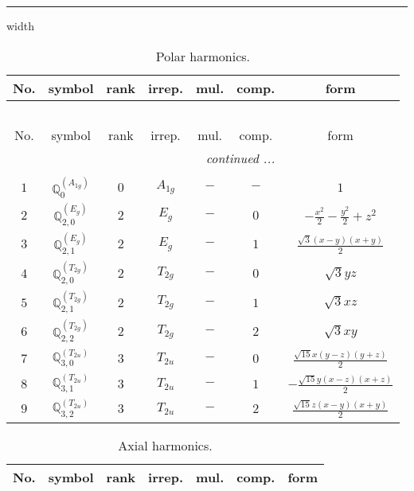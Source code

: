 \documentclass[fleqn,10pt,landscape]{article}
\begin{document}
\begin{itemize}
 \hfil \hrule height 1mm width \textwidth \hfil

\begin{center}
\renewcommand{\arraystretch}{1.3}
\begin{longtable}{ccccccc}
\caption{Polar harmonics.}
 \\
 \hline \hline
No. & symbol & rank & irrep. & mul. & comp. & form \\ \hline \endfirsthead

\multicolumn{6}{l}{\tablename\ \thetable{}} \\
 \hline \hline
No. & symbol & rank & irrep. & mul. & comp. & form \\ \hline \endhead

 \hline \hline
\multicolumn{6}{r}{\footnotesize\it continued ...} \\ \endfoot

 \hline \hline
\multicolumn{6}{r}{} \\ \endlastfoot

$ 1 $ & $ \mathbb{Q}_{0}^{(A_{1g})} $ & $ 0 $ & $ A_{1g} $ & $ - $ & $ - $ & $ 1 $ \\ \hline
$ 2 $ & $ \mathbb{Q}_{2,0}^{(E_{g})} $ & $ 2 $ & $ E_{g} $ & $ - $ & $ 0 $ & $ - \frac{x^{2}}{2} - \frac{y^{2}}{2} + z^{2} $ \\
$ 3 $ & $ \mathbb{Q}_{2,1}^{(E_{g})} $ & $ 2 $ & $ E_{g} $ & $ - $ & $ 1 $ & $ \frac{\sqrt{3} \left(x - y\right) \left(x + y\right)}{2} $ \\
$ 4 $ & $ \mathbb{Q}_{2,0}^{(T_{2g})} $ & $ 2 $ & $ T_{2g} $ & $ - $ & $ 0 $ & $ \sqrt{3} y z $ \\
$ 5 $ & $ \mathbb{Q}_{2,1}^{(T_{2g})} $ & $ 2 $ & $ T_{2g} $ & $ - $ & $ 1 $ & $ \sqrt{3} x z $ \\
$ 6 $ & $ \mathbb{Q}_{2,2}^{(T_{2g})} $ & $ 2 $ & $ T_{2g} $ & $ - $ & $ 2 $ & $ \sqrt{3} x y $ \\ \hline
$ 7 $ & $ \mathbb{Q}_{3,0}^{(T_{2u})} $ & $ 3 $ & $ T_{2u} $ & $ - $ & $ 0 $ & $ \frac{\sqrt{15} x \left(y - z\right) \left(y + z\right)}{2} $ \\
$ 8 $ & $ \mathbb{Q}_{3,1}^{(T_{2u})} $ & $ 3 $ & $ T_{2u} $ & $ - $ & $ 1 $ & $ - \frac{\sqrt{15} y \left(x - z\right) \left(x + z\right)}{2} $ \\
$ 9 $ & $ \mathbb{Q}_{3,2}^{(T_{2u})} $ & $ 3 $ & $ T_{2u} $ & $ - $ & $ 2 $ & $ \frac{\sqrt{15} z \left(x - y\right) \left(x + y\right)}{2} $ \\
\end{longtable}
\end{center}
\begin{center}
\renewcommand{\arraystretch}{1.3}
\begin{longtable}{ccccccc}
\caption{Axial harmonics.}
 \\
 \hline \hline
No. & symbol & rank & irrep. & mul. & comp. & form \\ \hline \endfirsthead


\end{longtable}
\end{center}
\end{itemize}
\end{document}
